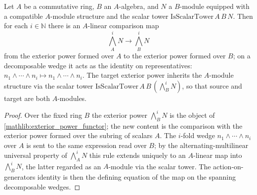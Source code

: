 \begin{lemma}
  \label{found:exterior_base_change_linear}
  Let \(A\) be a commutative ring, \(B\) an \(A\)-algebra, and \(N\) a
  \(B\)-module equipped with a compatible \(A\)-module structure and the scalar
  tower \(\mathrm{IsScalarTower}\,A\,B\,N\).  Then for each \(i\in\mathbb N\)
  there is an \(A\)-linear comparison map
  \[
    \textstyle\bigwedge^i_A N\to\bigwedge^i_B N
  \]
  from the exterior power formed over \(A\) to the exterior power formed over
  \(B\); on a decomposable wedge it acts as the identity on representatives:
  \(n_1\wedge\cdots\wedge n_i\mapsto n_1\wedge\cdots\wedge n_i\).  The target
  exterior power inherits the \(A\)-module structure via the scalar tower
  \(\mathrm{IsScalarTower}\,A\,B\,(\bigwedge^i_B N)\), so that source and target
  are both \(A\)-modules.
\end{lemma}

\begin{proof}
  \leanok
  Over the fixed ring \(B\) the exterior power \(\bigwedge^i_B N\) is the object
  of \cref{mathlib:exterior_power_functor}; the new content is the
  comparison with the exterior power formed over the subring of scalars \(A\).
  The \(i\)-fold wedge \(n_1\wedge\cdots\wedge n_i\) over \(A\) is sent to the
  same expression read over \(B\); by the alternating-multilinear universal
  property of \(\bigwedge^i_A N\) this rule extends uniquely to an \(A\)-linear
  map into \(\bigwedge^i_B N\), the latter regarded as an \(A\)-module via the
  scalar tower.  The action-on-generators identity is then the defining equation
  of the map on the spanning decomposable wedges.
\end{proof}

